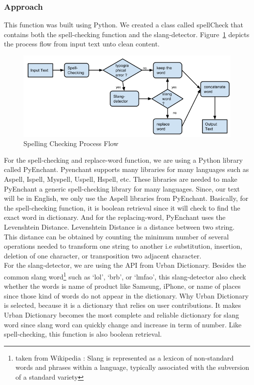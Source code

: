 \subsubsection*{Approach}
This function was built using Python. We created a class called spellCheck that contains both the spell-checking function and the slang-detector. Figure~\ref{fig:spellprocess}  depicts the process flow from input text unto clean content.
\begin{figure}[h!]
\centering
\includegraphics[scale=0.5]{images/spellprocess.png}
\caption{Spelling Checking Process Flow}
\label{fig:spellprocess}
\end{figure}
For the spell-checking and replace-word function, we are using a Python library called PyEnchant. Pyenchant supports many libraries for many languages such as Aspell, Ispell, Myspell, Uspell, Hspell, etc. These libraries are needed to make PyEnchant a generic spell-checking library for many languages. Since, our text will be in English, we only use the Aspell libraries from PyEnchant. Basically, for the spell-checking function, it is boolean retrieval since it will check to find the exact word in dictionary. And for the replacing-word, PyEnchant uses the Levenshtein Distance. Levenshtein Distance is a distance between two string. This distance can be obtained by counting the minimum number of several operations needed to transform one string to another i.e substitution, insertion, deletion of one character, or transposition two adjacent character. \\
For the slang-detector, we are using the API from Urban Dictionary. Besides the common slang word\footnote{taken from Wikipedia : Slang is represented as a lexicon of non-standard words and phrases within a language, typically associated with the subversion of a standard variety} such as ‘lol’, ‘brb’, or ‘lmfao’, this slang-detector also check whether the words is name of product like Samsung, iPhone, or name of places since those kind of words do not appear in the dictionary. Why Urban Dictionary is selected, because it is a dictionary that relies on user contributions. It makes Urban Dictionary becomes the most complete and reliable dictionary for  slang word since slang word can quickly change and increase in term of number. Like spell-checking, this function is also  boolean retrieval.  \\
